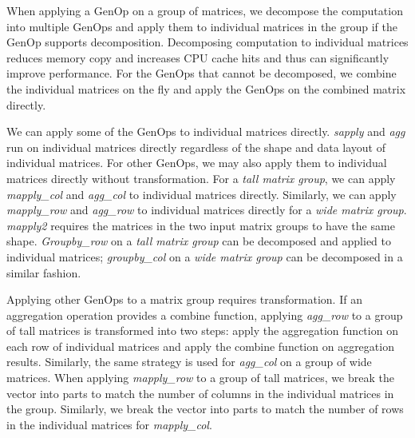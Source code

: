 When applying a GenOp on a group of matrices,
we decompose the computation into multiple GenOps and apply them to individual
matrices in the group if the GenOp supports decomposition. Decomposing computation
to individual matrices reduces memory copy and increases CPU cache hits and thus
can significantly improve performance. For the GenOps that cannot be decomposed,
we combine the individual matrices on the fly and apply the GenOps on the combined
matrix directly.

We can apply some of the GenOps to individual matrices directly. \textit{sapply}
and \textit{agg} run on individual matrices directly regardless of the shape
and data layout of individual matrices. For other GenOps, we may also apply
them to individual matrices directly without transformation. For a
\textit{tall matrix group}, we can apply \textit{mapply\_col} and \textit{agg\_col}
to individual matrices directly.
Similarly, we can apply \textit{mapply\_row} and \textit{agg\_row} to
individual matrices directly for a \textit{wide matrix group}. \textit{mapply2}
requires the matrices in the two input matrix groups to have the same shape.
\textit{Groupby\_row} on a \textit{tall matrix group} can be decomposed and
applied to individual matrices; \textit{groupby\_col} on a \textit{wide matrix group}
can be decomposed in a similar fashion.

Applying other GenOps to a matrix group requires transformation. If an aggregation
operation provides a combine function, applying \textit{agg\_row} to a group of
tall matrices is transformed into two steps: apply the aggregation function on
each row of individual matrices and apply the combine function on aggregation
results. Similarly, the same strategy is used for \textit{agg\_col} on a group
of wide matrices. When applying \textit{mapply\_row} to a group of tall matrices,
we break the vector into parts to match the number of columns in the individual
matrices in the group. Similarly, we break the vector into parts to match the number
of rows in the individual matrices for \textit{mapply\_col}.

